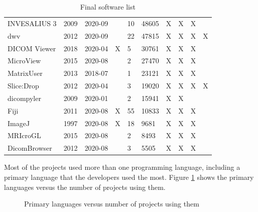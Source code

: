 \begin{table}[H]
\begin{tabular}{llllllllll}
INVESALIUS 3 \cite{Amorim2015} & 2009 & 2020-09 &  & 10 & 48605 & X & X & X &  \\
dwv \cite{Martelli2021} & 2012 & 2020-09 &  & 22 & 47815 & X & X & X & X \\
DICOM Viewer \cite{Afsar2021} & 2018 & 2020-04 & X & 5 & 30761 & X & X & X &  \\
MicroView \cite{ParallaxInnovations2020} & 2015 & 2020-08 &  & 2 & 27470 & X & X & X &  \\
MatrixUser \cite{Liu2016} & 2013 & 2018-07 &  & 1 & 23121 & X & X & X &  \\
Slice:Drop \cite{Haehn2013} & 2012 & 2020-04 &  & 3 & 19020 & X & X & X & X \\
dicompyler \cite{Panchal2010} & 2009 & 2020-01 &  & 2 & 15941 & X & X &  &  \\
Fiji \cite{Schindelin2012} & 2011 & 2020-08 & X & 55 & 10833 & X & X & X &  \\
ImageJ \cite{Rueden2017} & 1997 & 2020-08 & X & 18 & 9681 & X & X & X &  \\
MRIcroGL \cite{Rorden2021} & 2015 & 2020-08 &  & 2 & 8493 & X & X & X &  \\
DicomBrowser \cite{Archie2012} & 2012 & 2020-08 &  & 3 & 5505 & X & X & X &  \\ \hline
\end{tabular}
\caption{\label{tab_final_list}Final software list}
\end{table}

Most of the projects used more than one programming language, including a primary language that the developers used the most. Figure \ref{fig_language} shows the primary languages versus the number of projects using them.

\begin{figure}[H]
\centering
{}
\caption{\label{fig_language}Primary languages versus number of projects using them}
\end{figure}

